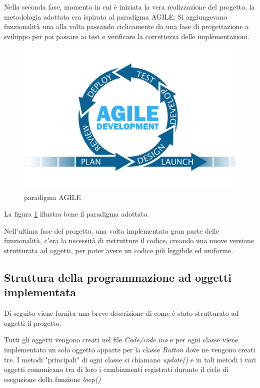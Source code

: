 \documentclass[paper=a4, fontsize=10pt]{scrartcl}
\begin{document}
Nella seconda fase, momento in cui è iniziata la vera realizzazione del progetto, la metodologia adottata era ispirata al paradigma AGILE: Si aggiungevano funzionalità una alla volta passando ciclicamente da una fase di progettazione a sviluppo per poi passare ai test e verificare la correttezza delle implementazioni.

\begin{figure}
  \includegraphics[scale=0.2]{AGILE.jpeg}
  \caption{paradigma AGILE}
  \label{fig:agile1}
\end{figure}
    
La figura \ref{fig:agile1}
illustra bene il paradigma adottato.


Nell'ultima fase del progetto, una volta implementata gran parte delle funzionalità, c'era la necessità di ristrutture il codice, creando una nuove versione strutturata ad oggetti, per poter avere un codice più leggibile ed uniforme.

\pagebreak

\subsection{Struttura della programmazione ad oggetti implementata}
Di seguito viene fornita una breve descrizione di come è stato strutturato ad oggetti il progetto.

Tutti gli oggetti vengono creati nel file \textit{Code/code.ino} e per ogni classe viene implementato un solo oggetto apparte per la classe \textit{Button} dove ne vengono creati tre. I metodi "principali" di ogni classe si chiamano \textit{update()} e in tali metodi i vari oggetti comunicano tra di loro i cambiamenti registrati durante il ciclo di eseguzione della funzione \textit{loop()}
\end{document}
